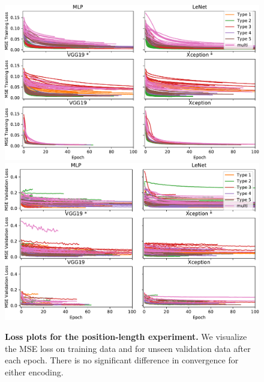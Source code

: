 \documentclass[journal]{vgtc}        %
\begin{document}
\begin{figure}[tbhp]
	\centering
	  \includegraphics[width=\linewidth]{../gfx/figure4_training_loss_with_multi.pdf}
	  \includegraphics[width=\linewidth]{../gfx/figure4_val_loss_with_multi.pdf}
  \caption{\textbf{Loss plots for the position-length experiment.} We visualize the MSE loss on training data and for unseen validation data after each epoch. There is no significant difference in convergence for either encoding.}
	\label{fig:fig4_loss}
\end{figure}
\end{document}
